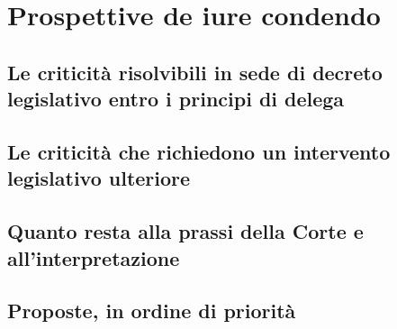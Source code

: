 

\chapter{Prospettive de iure condendo}
\label{cap:cap7}

\section{Le criticità risolvibili in sede di decreto legislativo entro i principi di delega}
\label{sez:cap7:delega}


\section{Le criticità che richiedono un intervento legislativo ulteriore}
\label{sez:cap7:nuovalegge}


\section{Quanto resta alla prassi della Corte e all'interpretazione}
\label{sez:cap7:prassi}


\section{Proposte, in ordine di priorità}
\label{sez:cap7:proposte}


